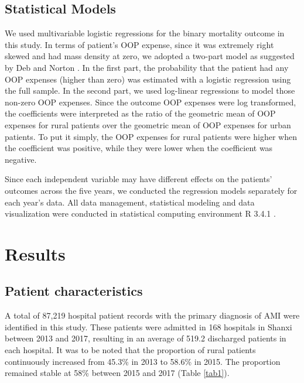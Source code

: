 \documentclass[ijerph,article,submit,moreauthors,pdftex,10pt,a4paper]{mdpi}
\theoremstyle{mdpi}
\newcounter{ex}
\newcounter{re}
\theoremstyle{mdpidefinition}
\begin{document}
\subsection{Statistical Models}
We used multivariable logistic regressions for the binary mortality outcome in this study. In terms of patient's OOP expense, since it was extremely right skewed and had mass density at zero, we adopted a two-part model as suggested by Deb and Norton \cite{deb2018modeling}. In the first part, the probability that the patient had any OOP expenses (higher than zero) was estimated with a logistic regression using the full sample. In the second part, we used log-linear regressions to model those non-zero OOP expenses. Since the outcome OOP expenses were log transformed, the coefficients were interpreted as the ratio of the geometric mean of OOP expenses for rural patients over the geometric mean of OOP expenses for urban patients. To put it simply, the OOP expenses for rural patients were higher when the coefficient was positive, while they were lower when the coefficient was negative.

Since each independent variable may have different effects on the patients' outcomes across the five years, we conducted the regression models separately for each year's data. All data management, statistical modeling and data visualization were conducted in statistical computing environment R 3.4.1 \cite{team2013r}.

\section{Results}
\subsection{Patient characteristics}
A total of 87,219 hospital patient records with the primary diagnosis of AMI were identified in this study. These patients were admitted in 168 hospitals in Shanxi between 2013 and 2017, resulting in an average of 519.2 discharged patients in each hospital. It was to be noted that the proportion of rural patients continuously increased from 45.3\% in 2013 to 58.6\% in 2015. The proportion remained stable at 58\% between 2015 and 2017 (Table \ref{tab1}).
\end{document}

